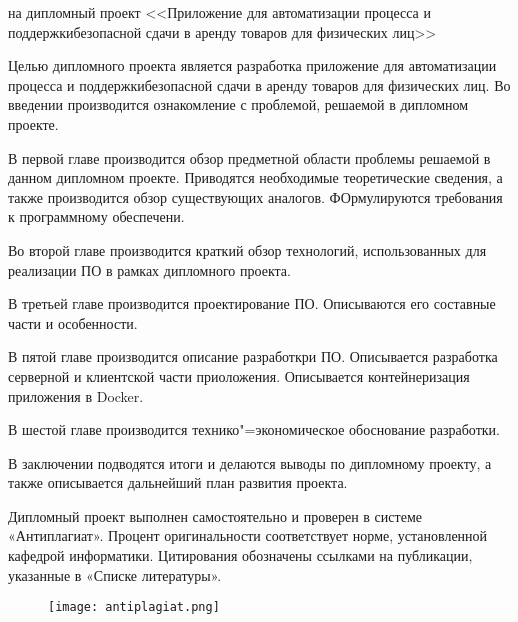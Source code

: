 \thispagestyle{empty}

\begin{center}
  \begin{minipage}{0.82\textwidth}
    на дипломный проект <<Приложение для автоматизации процесса и поддержкибезопасной сдачи в аренду товаров для физических лиц>>
  \end{minipage}
\end{center}

Целью дипломного проекта является разработка приложение для автоматизации процесса и поддержкибезопасной сдачи в аренду товаров для физических лиц.
Во введении производится ознакомление с проблемой, решаемой в дипломном проекте.

В первой главе производится обзор предметной области проблемы решаемой в данном дипломном проекте.
Приводятся необходимые теоретические сведения, а также производится обзор существующих аналогов.
ФОрмулируются требования к программному обеспечени.

Во второй главе производится краткий обзор технологий, использованных для реализации ПО в рамках дипломного проекта.

В третьей главе производится проектирование ПО.
Описываются его составные части и особенности.

В пятой главе производится описание разработкри ПО.
Описывается разработка серверной и клиентской части приоложения.
Описывается контейнеризация приложения в Docker.

В шестой главе производится технико"=экономическое обоснование разработки.

В заключении подводятся итоги и делаются выводы по дипломному проекту, а также описывается дальнейший план развития проекта.

Дипломный проект выполнен самостоятельно и проверен в системе «Антиплагиат».
Процент оригинальности соответствует норме, установленной кафедрой информатики.
Цитирования обозначены ссылками на публикации, указанные в «Списке литературы».

\begin{figure}[h]
  \centering
  \texttt{[image: antiplagiat.png]}
\end{figure}

\clearpage
